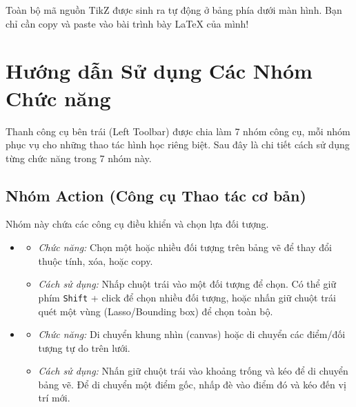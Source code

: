 \documentclass[12pt,a4paper]{article}
\begin{document}
\vspace{0.5cm}
\begin{infobox}
Toàn bộ mã nguồn TikZ được sinh ra tự động ở bảng phía dưới màn hình. Bạn chỉ cần copy và paste vào bài trình bày LaTeX của mình!
\end{infobox}

\section{Hướng dẫn Sử dụng Các Nhóm Chức năng}
Thanh công cụ bên trái (Left Toolbar) được chia làm 7 nhóm công cụ, mỗi nhóm phục vụ cho những thao tác hình học riêng biệt. Sau đây là chi tiết cách sử dụng từng chức năng trong 7 nhóm này.

\subsection{Nhóm Action (Công cụ Thao tác cơ bản)}
Nhóm này chứa các công cụ điều khiển và chọn lựa đối tượng.
\begin{itemize}[label=\textcolor{primary}{\faHandPointer}]
    \item {} 
    \begin{itemize}
        \item \textit{Chức năng:} Chọn một hoặc nhiều đối tượng trên bảng vẽ để thay đổi thuộc tính, xóa, hoặc copy.
        \item \textit{Cách sử dụng:} Nhấp chuột trái vào một đối tượng để chọn. Có thể giữ phím \texttt{Shift} + click để chọn nhiều đối tượng, hoặc nhấn giữ chuột trái quét một vùng (Lasso/Bounding box) để chọn toàn bộ.
    \end{itemize}
    
    \item {} 
    \begin{itemize}
        \item \textit{Chức năng:} Di chuyển khung nhìn (canvas) hoặc di chuyển các điểm/đối tượng tự do trên lưới.
        \item \textit{Cách sử dụng:} Nhấn giữ chuột trái vào khoảng trống và kéo để di chuyển bảng vẽ. Để di chuyển một điểm gốc, nhấp đè vào điểm đó và kéo đến vị trí mới.
    \end{itemize}
\end{itemize}
\end{document}

